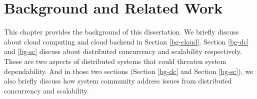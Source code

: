 \chapter{Background and Related Work}
\label{chp-bg}

This chapter provides the background of this dissertation. We briefly discuss
about cloud computing and cloud backend in Section \ref{bg-cloud}. Section
\ref{bg-dc} and \ref{bg-sc} discuss about distributed concurrency and
scalability respectively. These are two aspects of distributed systems that
could threaten system dependability. And in those two sections (Section
\ref{bg-dc} and Section \ref{bg-sc}), we also briefly discuss how system
community address issues from distributed concurrency and scalability.
%



%


